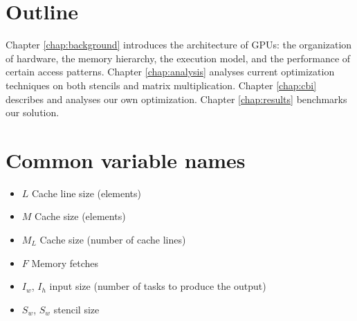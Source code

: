 \section{Outline}
Chapter \ref{chap:background} introduces the architecture of GPUs: the organization of hardware, the memory hierarchy, the execution model, and the performance of certain access patterns.
Chapter \ref{chap:analysis} analyses current optimization techniques on both stencils and matrix multiplication.
Chapter \ref{chap:cbi} describes and analyses our own optimization.
Chapter \ref{chap:results} benchmarks our solution.

\section{Common variable names}
\begin{itemize}
    \item $L$ Cache line size (elements)
    \item $M$ Cache size (elements)
    \item $M_L$ Cache size (number of cache lines)
    \item $F$ Memory fetches
    \item $I_w$, $I_h$ input size (number of tasks to produce the output)
    \item $S_w$, $S_w$ stencil size
\end{itemize}